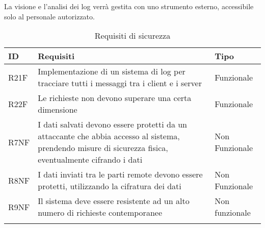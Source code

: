 La visione e l'analisi dei log verrà gestita con uno strumento esterno,
accessibile solo al personale autorizzato.


\begin{longtable}{|P{1.3cm}|P{11.2cm}|P{3cm}|}
    \hline
    \textbf{ID}             & \textbf{Requisiti}                                                                           & \textbf{Tipo}  \\
    \hline
    \endhead
    R21F                    & Implementazione di un sistema di log per tracciare tutti i messaggi
    tra i client e i server & Funzionale                                                                                                    \\
    \hline
    R22F                    & Le richieste non devono superare una certa dimensione                                        & Funzionale     \\
    \hline
    R7NF                    & I dati salvati devono essere protetti da un attaccante che abbia
    accesso al sistema, prendendo misure di sicurezza fisica, eventualmente
    cifrando i dati         & Non Funzionale                                                                                                \\
    \hline
    R8NF                    & I dati inviati tra le parti remote devono essere protetti, utilizzando la cifratura dei dati & Non Funzionale \\
    \hline
    R9NF                    & Il sistema deve essere resistente ad un alto numero di richieste contemporanee               & Non funzionale \\
    \hline
    \caption{Requisiti di sicurezza}
\end{longtable}

\clearpage